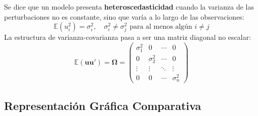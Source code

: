 \documentclass[12pt,a4paper]{report}
\theoremstyle{definition}
\theoremstyle{remark}
\newcommand{\E}{\mathbb{E}}
\begin{document}
\begin{tcolorbox}[defstyle, title={Definición 11.2: Heteroscedasticidad}]
  Se dice que un modelo presenta \textbf{heteroscedasticidad} cuando la varianza de las perturbaciones no es constante, sino que varía a lo largo de las observaciones:
  \begin{equation}
    \E(u_i^2) = \sigma_i^2, \quad \sigma_i^2 \neq \sigma_j^2 \text{ para al menos algún } i \neq j
    \label{eq:hetero}
  \end{equation}
  La estructura de varianza-covarianza pasa a ser una matriz diagonal no escalar:
  \begin{equation}
    \E(\mathbf{u}\mathbf{u}') = \boldsymbol{\Omega} =
    \begin{pmatrix}
      \sigma_1^2 & 0 & \cdots & 0 \\
      0 & \sigma_2^2 & \cdots & 0 \\
      \vdots & \vdots & \ddots & \vdots \\
      0 & 0 & \cdots & \sigma_n^2
    \end{pmatrix}
    \label{eq:omega}
  \end{equation}
\end{tcolorbox}

\subsection{Representación Gráfica Comparativa}
\end{document}
